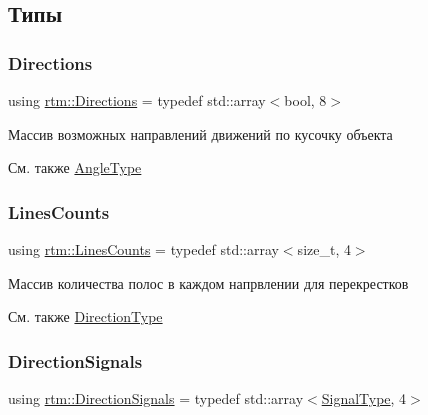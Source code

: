 \subsection{Типы}
\mbox{\label{namespacertm_a4776fbfe59834ff1a16838ad6735b69a}} 
\subsubsection{\texorpdfstring{Directions}{Directions}}
{\footnotesize\ttfamily using \hyperlink{namespacertm_a4776fbfe59834ff1a16838ad6735b69a}{rtm\+::\+Directions} = typedef std\+::array$<$bool, 8$>$}

Массив возможных направлений движений по кусочку объекта \begin{DoxySeeAlso}{См. также}
\hyperlink{namespacertm_a69dc82b16a0148c10962caa83d930f89}{Angle\+Type} 
\end{DoxySeeAlso}
\mbox{\label{namespacertm_a14457f3088a92b86a96686b72d3e4eea}} 
\subsubsection{\texorpdfstring{Lines\+Counts}{LinesCounts}}
{\footnotesize\ttfamily using \hyperlink{namespacertm_a14457f3088a92b86a96686b72d3e4eea}{rtm\+::\+Lines\+Counts} = typedef std\+::array$<$size\+\_\+t, 4$>$}

Массив количества полос в каждом напрвлении для перекрестков \begin{DoxySeeAlso}{См. также}
\hyperlink{namespacertm_a57b216f3aeb45041f3461bab08bc3aeb}{Direction\+Type} 
\end{DoxySeeAlso}
\mbox{\label{namespacertm_a681634e130c2137fe63a658b0e0a5e46}} 
\subsubsection{\texorpdfstring{Direction\+Signals}{DirectionSignals}}
{\footnotesize\ttfamily using \hyperlink{namespacertm_a681634e130c2137fe63a658b0e0a5e46}{rtm\+::\+Direction\+Signals} = typedef std\+::array$<$\hyperlink{namespacertm_aadb7300c15d57429546fb0b7f8ee0ee6}{Signal\+Type}, 4$>$}

